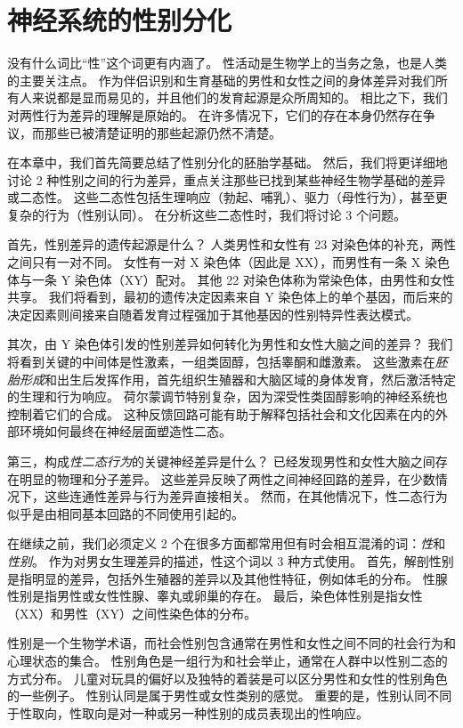 \chapter{神经系统的性别分化} \label{chap:chap51}

没有什么词比“性”这个词更有内涵了。
性活动是生物学上的当务之急，也是人类的主要关注点。
作为伴侣识别和生育基础的男性和女性之间的身体差异对我们所有人来说都是显而易见的，并且他们的发育起源是众所周知的。
相比之下，我们对两性行为差异的理解是原始的。
在许多情况下，它们的存在本身仍然存在争议，而那些已被清楚证明的那些起源仍然不清楚。


在本章中，我们首先简要总结了性别分化的胚胎学基础。
然后，我们将更详细地讨论 2 种性别之间的行为差异，重点关注那些已找到某些神经生物学基础的差异或二态性。
这些二态性包括生理响应（勃起、哺乳）、驱力（母性行为），甚至更复杂的行为（性别认同）。
在分析这些二态性时，我们将讨论 3 个问题。


首先，性别差异的遗传起源是什么？
人类男性和女性有 23 对染色体的补充，两性之间只有一对不同。
女性有一对 X 染色体（因此是 XX），而男性有一条 X 染色体与一条 Y 染色体（XY）配对。
其他 22 对染色体称为常染色体，由男性和女性共享。
我们将看到，最初的遗传决定因素来自 Y 染色体上的单个基因，而后来的决定因素则间接来自随着发育过程强加于其他基因的性别特异性表达模式。


其次，由 Y 染色体引发的性别差异如何转化为男性和女性大脑之间的差异？
我们将看到关键的中间体是性激素，一组类固醇，包括睾酮和雌激素。
这些激素在\textit{胚胎形成}和出生后发挥作用，首先组织生殖器和大脑区域的身体发育，然后激活特定的生理和行为响应。
荷尔蒙调节特别复杂，因为深受性类固醇影响的神经系统也控制着它们的合成。
这种反馈回路可能有助于解释包括社会和文化因素在内的外部环境如何最终在神经层面塑造性二态。


第三，构成\textit{性二态行为}的关键神经差异是什么？
已经发现男性和女性大脑之间存在明显的物理和分子差异。
这些差异反映了两性之间神经回路的差异，在少数情况下，这些连通性差异与行为差异直接相关。
然而，在其他情况下，性二态行为似乎是由相同基本回路的不同使用引起的。


在继续之前，我们必须定义 2 个在很多方面都常用但有时会相互混淆的词：\textit{性}和\textit{性别}。
作为对男女生理差异的描述，性这个词以 3 种方式使用。
首先，解剖性别是指明显的差异，包括外生殖器的差异以及其他性特征，例如体毛的分布。
性腺性别是指男性或女性性腺、睾丸或卵巢的存在。
最后，染色体性别是指女性（XX）和男性（XY）之间性染色体的分布。


性别是一个生物学术语，而社会性别包含通常在男性和女性之间不同的社会行为和心理状态的集合。
性别角色是一组行为和社会举止，通常在人群中以性别二态的方式分布。
儿童对玩具的偏好以及独特的着装是可以区分男性和女性的性别角色的一些例子。
性别认同是属于男性或女性类别的感觉。
重要的是，性别认同不同于性取向，性取向是对一种或另一种性别的成员表现出的性响应。


